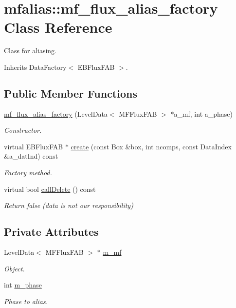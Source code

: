 \hypertarget{classmfalias_1_1mf__flux__alias__factory}{}\section{mfalias\+:\+:mf\+\_\+flux\+\_\+alias\+\_\+factory Class Reference}
\label{classmfalias_1_1mf__flux__alias__factory}


Class for aliasing.  




Inherits Data\+Factory$<$ E\+B\+Flux\+F\+A\+B $>$.

\subsection*{Public Member Functions}
\begin{DoxyCompactItemize}
\item 
\hyperlink{classmfalias_1_1mf__flux__alias__factory_a0743751e615219f192f3b48397ce491c}{mf\+\_\+flux\+\_\+alias\+\_\+factory} (Level\+Data$<$ M\+F\+Flux\+F\+AB $>$ $\ast$a\+\_\+mf, int a\+\_\+phase)
\begin{DoxyCompactList}\small\item\em Constructor. \end{DoxyCompactList}\item 
virtual E\+B\+Flux\+F\+AB $\ast$ \hyperlink{classmfalias_1_1mf__flux__alias__factory_a809c39bf790a76ba4f9dc4fcf4192c0a}{create} (const Box \&box, int ncomps, const Data\+Index \&a\+\_\+dat\+Ind) const 
\begin{DoxyCompactList}\small\item\em Factory method. \end{DoxyCompactList}\item 
virtual bool \hyperlink{classmfalias_1_1mf__flux__alias__factory_a4be29780d794945e0b8b23ff6d7712e9}{call\+Delete} () const 
\begin{DoxyCompactList}\small\item\em Return false (data is not our responsibility) \end{DoxyCompactList}\end{DoxyCompactItemize}
\subsection*{Private Attributes}
\begin{DoxyCompactItemize}
\item 
Level\+Data$<$ M\+F\+Flux\+F\+AB $>$ $\ast$ \hyperlink{classmfalias_1_1mf__flux__alias__factory_a5df3267770af0e472d2909f906c053e2}{m\+\_\+mf}
\begin{DoxyCompactList}\small\item\em Object. \end{DoxyCompactList}\item 
int \hyperlink{classmfalias_1_1mf__flux__alias__factory_a68caadafcc2226984b0c40cc212994e4}{m\+\_\+phase}
\begin{DoxyCompactList}\small\item\em Phase to alias. \end{DoxyCompactList}\end{DoxyCompactItemize}


